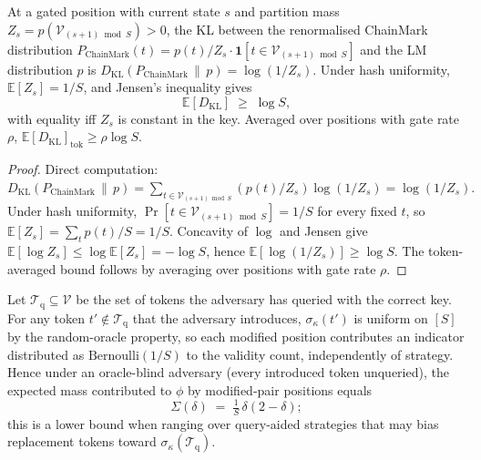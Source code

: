 \begin{theorem}
  \label{thm:quality}
  At a gated position with current state $s$ and partition mass
  $Z_s = p(\mathcal{V}_{(s+1) \bmod S}) > 0$, the KL between the
  renormalised ChainMark distribution
  $P_{\mathrm{ChainMark}}(t) = p(t)/Z_s \cdot
    \mathbf{1}[t \in \mathcal{V}_{(s+1) \bmod S}]$
  and the LM distribution $p$ is
  \(D_{\mathrm{KL}}(P_{\mathrm{ChainMark}} \,\|\, p) = \log(1/Z_s).\)
  Under hash uniformity, $\mathbb{E}[Z_s] = 1/S$, and Jensen's
  inequality gives
  \begin{equation}
    \mathbb{E}[D_{\mathrm{KL}}] \;\geq\; \log S,
  \end{equation}
  with equality iff $Z_s$ is constant in the key.  Averaged over
  positions with gate rate $\rho$,
  $\mathbb{E}[D_{\mathrm{KL}}]_{\mathrm{tok}} \geq \rho \log S$.
\end{theorem}

\begin{proof}
  Direct computation:
  \(D_{\mathrm{KL}}(P_{\mathrm{ChainMark}} \,\|\, p)
    = \sum_{t \in \mathcal{V}_{(s+1) \bmod S}} (p(t)/Z_s)
        \log(1/Z_s)
    = \log(1/Z_s).\)
  Under hash uniformity, $\Pr[t \in \mathcal{V}_{(s+1) \bmod S}] =
  1/S$ for every fixed $t$, so $\mathbb{E}[Z_s] = \sum_t p(t)/S =
  1/S$.  Concavity of $\log$ and Jensen give
  $\mathbb{E}[\log Z_s] \leq \log \mathbb{E}[Z_s] = -\log S$, hence
  $\mathbb{E}[\log(1/Z_s)] \geq \log S$.  The token-averaged bound
  follows by averaging over positions with gate rate $\rho$.
\end{proof}

\begin{theorem}
  \label{thm:healing}
  Let $\mathcal{T}_{\mathrm{q}} \subseteq \mathcal{V}$ be the set of tokens
  the adversary has queried with the correct key.  For any token
  $t' \notin \mathcal{T}_{\mathrm{q}}$ that the adversary introduces,
  $\sigma_\kappa(t')$ is uniform on $[S]$ by the random-oracle
  property, so each modified position contributes an indicator
  distributed as $\mathrm{Bernoulli}(1/S)$ to the validity count,
  independently of strategy.  Hence under an oracle-blind adversary
  (every introduced token unqueried), the expected mass contributed
  to $\phi$ by modified-pair positions equals
  \begin{equation}
    \Sigma(\delta)
      \;=\; \tfrac{1}{S}\, \delta(2 - \delta);
  \end{equation}
  this is a lower bound when ranging over query-aided strategies that
  may bias replacement tokens toward $\sigma_\kappa(\mathcal{T}_{\mathrm{q}})$.
\end{theorem}

